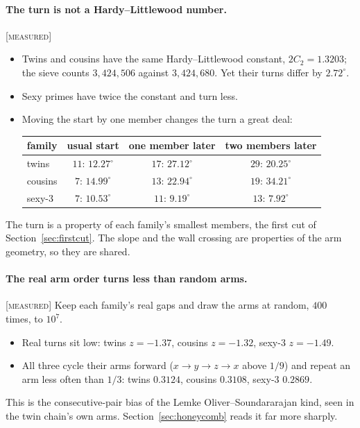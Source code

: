 \documentclass[11pt]{article}
\theoremstyle{definition}
\theoremstyle{remark}
\newcommand{\grade}[1]{\textsc{[#1]}}
\begin{document}
\paragraph{The turn is not a Hardy--Littlewood number.} \grade{measured}
\begin{itemize}
\item Twins and cousins have the same Hardy--Littlewood constant, $2C_2=1.3203$; the sieve counts $3{,}424{,}506$ against $3{,}424{,}680$. Yet their turns differ by $2.72^\circ$.
\item Sexy primes have twice the constant and turn less.
\item Moving the start by one member changes the turn a great deal:

\begin{center}\begin{tabular}{lccc}
\toprule
family & usual start & one member later & two members later\\
\midrule
twins & $11$: $12.27^\circ$ & $17$: $27.12^\circ$ & $29$: $20.25^\circ$\\
cousins & $7$: $14.99^\circ$ & $13$: $22.94^\circ$ & $19$: $34.21^\circ$\\
sexy-3 & $7$: $10.53^\circ$ & $11$: $9.19^\circ$ & $13$: $7.92^\circ$\\
\bottomrule
\end{tabular}\end{center}
\end{itemize}
The turn is a property of each family's smallest members, the first cut of Section~\ref{sec:firstcut}. The slope and the wall crossing are properties of the arm geometry, so they are shared.

\paragraph{The real arm order turns less than random arms.} \grade{measured}
Keep each family's real gaps and draw the arms at random, $400$ times, to $10^7$.
\begin{itemize}
\item Real turns sit low: twins $z=-1.37$, cousins $z=-1.32$, sexy-3 $z=-1.49$.
\item All three cycle their arms forward ($x\to y\to z\to x$ above $1/9$) and repeat an arm less often than $1/3$: twins $0.3124$, cousins $0.3108$, sexy-3 $0.2869$.
\end{itemize}
This is the consecutive-pair bias of the Lemke Oliver--Soundararajan kind, seen in the twin chain's own arms. Section~\ref{sec:honeycomb} reads it far more sharply.
\end{document}
